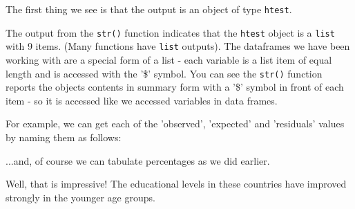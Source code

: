\documentclass[titlepage]{book}\usepackage{knitr}
\begin{document}
\begin{knitrout}
\color{fgcolor}\begin{kframe}
\begin{alltt}
\end{alltt}
\end{kframe}
\end{knitrout}
The first thing we see is that the output is an object of type \texttt{htest}.

The output from the \texttt{str()} function indicates that the \texttt{htest} object is a \texttt{list} with 9 items. (Many functions have \texttt{list} outputs). The dataframes we have been working with are a special form of a list - each variable is a list item of equal length and is accessed with the '\$' symbol. You can see the \texttt{str()} function reports the objects contents in summary form with a '\$' symbol in front of each item - so it is accessed like we accessed variables in data frames.

For example, we can get each of the 'observed', 'expected' and 'residuals' values by naming them as follows:

\begin{knitrout}
\color{fgcolor}\begin{kframe}
\begin{alltt}
\hlopt{$}
\hlopt{$}
\hlopt{$}
\end{alltt}
\end{kframe}
\end{knitrout}
...and, of course we can tabulate percentages as we did earlier.

\begin{knitrout}
\color{fgcolor}
\end{knitrout}
Well, that is impressive!  The educational levels in these countries have improved strongly in the younger age groups.
\end{document}
